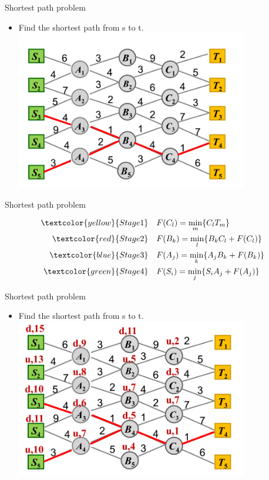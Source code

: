     \begin{frame}{Shortest path problem}
      \begin{itemize}
        \item Find the shortest path from s to t.
        \centering
        \includegraphics[width = 0.8\textwidth]{images/Shortest3.png}
      \end{itemize}
    \end{frame}

    \begin{frame}{Shortest path problem}
    \begin{spacing}{2}
    \begin{equation*}
      \begin{align}
    \textcolor{yellow}{Stage 1}\quad &F(C_l) = \min_m\{C_lT_m\} \\
    \textcolor{red}{Stage 2}\quad &F(B_k) = \min_l\{B_kC_l+F(C_l)\} \\
    \textcolor{blue}{Stage 3}\quad &F(A_j) = \min_k\{A_jB_k+F(B_k)\} \\
    \textcolor{green}{Stage 4}\quad &F(S_i) = \min_j\{S_iA_j+F(A_j)\}
      \end{align}
    \end{equation*}
    \end{spacing}
    \end{frame}

    \begin{frame}{Shortest path problem}
      \begin{itemize}
        \item Find the shortest path from s to t.
        \centering
        \includegraphics[width = 0.8\textwidth]{images/Shortest2.png}
      \end{itemize}
    \end{frame}


